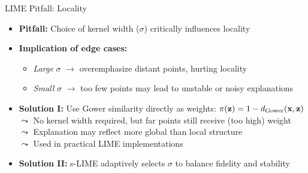 \documentclass[10pt,compress,t,notes=noshow, xcolor=table]{beamer}
\begin{document}
\begin{frame}{LIME Pitfall: Locality }

\begin{itemize}
  \item \textbf{Pitfall:} Choice of kernel width (\(\sigma\)) critically influences locality
  \pause
  \item \textbf{Implication of edge cases:}
  \begin{itemize}
    \item \emph{Large} $\sigma$ $\rightarrow$ overemphasize distant points, hurting locality
    \item \emph{Small} $\sigma$ $\rightarrow$ too few points may lead to unstable or noisy explanations
  \end{itemize}
  \pause
  \item  \textbf{Solution I:} Use Gower similarity directly as weights: \( \pi(\mathbf{z}) = 1 - d_{\text{Gower}}(\mathbf{x}, \mathbf{z}) \)\\
  $\leadsto$ No kernel width required, but far points still receive (too high) weight\\
  $\leadsto$ Explanation may reflect more global than local structure\\
  $\leadsto$ Used in practical LIME implementations 
  \pause
  \item \textbf{Solution II:} s-LIME adaptively selects \(\sigma\) to balance fidelity and stability 
\end{itemize}
\end{frame}
\end{document}
